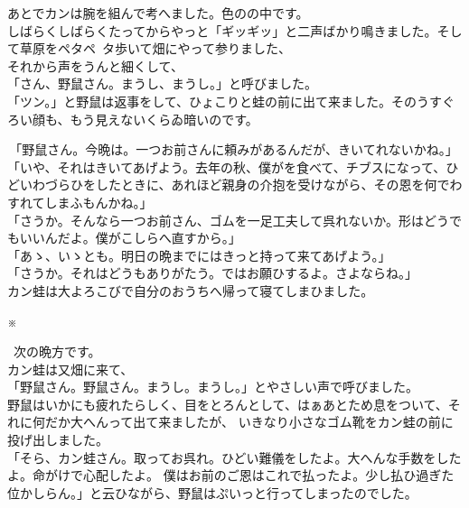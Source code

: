 \documentclass[
a4paper,
10pt,
book]
{tarticle}
\begin{document}
\begin{linenumbers}
  \indent あとでカンは腕を組んで考へました。色のの中です。\\
  しばらくしばらくたってからやっと「ギッギッ」と二声ばかり鳴きました。そして草原をペタペ~タ歩いて畑にやって参りました、\\
  \indent それから声をうんと細くして、\\
  「さん、野鼠さん。まうし、まうし。」と呼びました。\\
  「ツン。」と野鼠は返事をして、ひょこりと蛙の前に出て来ました。そのうすぐろい顔も、もう見えないくらゐ暗いのです。
\end{linenumbers}

\newpage
\setcounter{page}{6}
\thispagestyle{fancy}
\begin{linenumbers}
\noindent \,「野鼠さん。今晩は。一つお前さんに頼みがあるんだが、きいてれないかね。」\\
「いや、それはきいてあげよう。去年の秋、僕がを食べて、チブスになって、ひどいわづらひをしたときに、あれほど親身の介抱を受けながら、その恩を何でわすれてしまふもんかね。」\\
「さうか。そんなら一つお前さん、ゴムを一足工夫して呉れないか。形はどうでもいいんだよ。僕がこしらへ直すから。」\\
「あゝ、いゝとも。明日の晩までにはきっと持って来てあげよう。」\\
「さうか。それはどうもありがたう。ではお願ひするよ。さよならね。」\\
\indent カン蛙は大よろこびで自分のおうちへ帰って寝てしまひました。
\end{linenumbers}

\nolinenumbers
\indent \indent \indent \indent \indent \indent \indent \indent \indent \indent ※

\begin{linenumbers}
\noindent \, 次の晩方です。\\
\indent カン蛙は又畑に来て、\\
「野鼠さん。野鼠さん。まうし。まうし。」とやさしい声で呼びました。\\
\indent 野鼠はいかにも疲れたらしく、目をとろんとして、はぁあとため息をついて、それに何だか大へんって出て来ましたが、
いきなり小さなゴム靴をカン蛙の前に投げ出しました。\\
「そら、カン蛙さん。取ってお呉れ。ひどい難儀をしたよ。大へんな手数をしたよ。命がけで心配したよ。
僕はお前のご恩はこれで払ったよ。少し払ひ過ぎた位かしらん。」と云ひながら、野鼠はぷいっと行ってしまったのでした。
\end{linenumbers}
\end{document}
